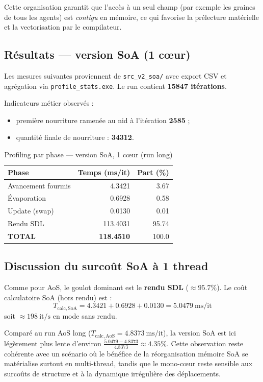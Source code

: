 Cette organisation garantit que l'accès à un seul champ (par exemple les graines de tous
les agents) est \emph{contigu} en mémoire, ce qui favorise la prélecture matérielle
et la vectorisation par le compilateur.

\subsection{Résultats — version SoA (1 cœur)}

Les mesures suivantes proviennent de \texttt{src\_v2\_soa/} avec export CSV
et agrégation via \texttt{profile\_stats.exe}. Le run contient
\textbf{15847 itérations}.

Indicateurs métier observés :
\begin{itemize}
    \item première nourriture ramenée au nid à l'itération \textbf{2585} ;
    \item quantité finale de nourriture : \textbf{34312}.
\end{itemize}

\begin{table}[h]
\centering
\caption{Profiling par phase — version SoA, 1 cœur (run long)}
\label{tab:soa_timing}
\begin{tabular}{lrr}
\hline
\textbf{Phase}      & \textbf{Temps (ms/it)} & \textbf{Part (\%)} \\
\hline
Avancement fourmis  & 4.3421   & 3.67  \\
Évaporation         & 0.6928   & 0.58  \\
Update (swap)       & 0.0130   & 0.01  \\
Rendu SDL           & 113.4031 & 95.74 \\
\hline
\textbf{TOTAL}      & \textbf{118.4510} & 100.0 \\
\hline
\end{tabular}
\end{table}

\subsection{Discussion du surcoût SoA à 1 thread}

Comme pour AoS, le goulot dominant est le \textbf{rendu SDL} (\(\approx 95.7\%\)).
Le coût calculatoire SoA (hors rendu) est :
\[
T_{\mathrm{calc,SoA}} = 4.3421 + 0.6928 + 0.0130 = 5.0479\ \mathrm{ms/it}
\]
soit \(\approx 198\ \mathrm{it/s}\) en mode sans rendu.

Comparé au run AoS long (\(T_{\mathrm{calc,AoS}} = 4.8373\ \mathrm{ms/it}\)),
la version SoA est ici légèrement plus lente d'environ \(\frac{5.0479-4.8373}{4.8373}
\approx 4.35\%\). Cette observation reste cohérente avec un scénario où le bénéfice
de la réorganisation mémoire SoA se matérialise surtout en multi-thread, tandis que
le mono-cœur reste sensible aux surcoûts de structure et à la dynamique irrégulière
des déplacements.

